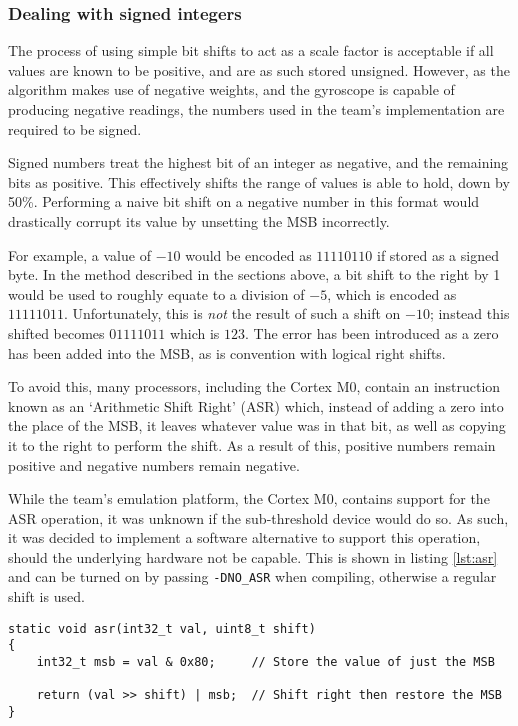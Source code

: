 \subsubsection{Dealing with signed integers \label{sec:asr}}

The process of using simple bit shifts to act as a scale factor is acceptable if all values are known to be positive, and are as such stored unsigned. However, as the algorithm makes use of negative weights, and the gyroscope is capable of producing negative readings, the numbers used in the team's implementation are required to be signed.

Signed numbers treat the highest bit of an integer as negative, and the remaining bits as positive. This effectively shifts the range of values is able to hold, down by 50\%. Performing a naive bit shift on a negative number in this format would drastically corrupt its value by unsetting the MSB incorrectly.

For example, a value of $-10$ would be encoded as $11110110$ if stored as a signed byte. In the method described in the sections above, a bit shift to the right by 1 would be used to roughly equate to a division of $-5$, which is encoded as $11111011$. Unfortunately, this is \textit{not} the result of such a shift on $-10$; instead this shifted becomes $01111011$ which is $123$. The error has been introduced as a zero has been added into the MSB, as is convention with logical right shifts.

To avoid this, many processors, including the Cortex M0, contain an instruction known as an `Arithmetic Shift Right' (ASR) which, instead of adding a zero into the place of the MSB, it leaves whatever value was in that bit, as well as copying it to the right to perform the shift. As a result of this, positive numbers remain positive and negative numbers remain negative.

While the team's emulation platform, the Cortex M0, contains support for the ASR operation, it was unknown if the sub-threshold device would do so. As such, it was decided to implement a software alternative to support this operation, should the underlying hardware not be capable. This is shown in listing \ref{lst:asr} and can be turned on by passing \verb|-DNO_ASR| when compiling, otherwise a regular shift is used.

\begin{lstlisting}[caption={Software Arithmetic Shift Right Support},label={lst:asr}]
static void asr(int32_t val, uint8_t shift)
{
    int32_t msb = val & 0x80;     // Store the value of just the MSB

    return (val >> shift) | msb;  // Shift right then restore the MSB
}
\end{lstlisting}